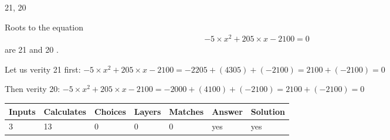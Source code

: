 \documentclass[12pt]{article}
\begin{document}
 
 
\noindent{}
 
 

21,  %
20
 
 
 
\noindent{}
 
 

 
 
 
\noindent{}
 
 

Roots to the equation
\begin{eqnarray*}
-5 \times x^2  %
+  %
205
                 \times x    %
-2100 =0
\end{eqnarray*}
are  %
21 and  %
20 .
 
Let us verity  %
21 first:
$  %
-5 \times x^2  %
+  %
205
                 \times x    %
-2100
  = %
-2205+( %
4305)+( %
-2100)
  = %
2100+( %
-2100)
  = %
0
$
 
Then verity  %
20:
$  %
-5 \times x^2  %
+  %
205
                 \times x    %
-2100
  = %
-2000+( %
4100)+( %
-2100)
  = %
2100+( %
-2100)
  = %
0
$
 
 
 
\noindent{}
 
 

 
\vspace{0.3in}
   
   
   
   
\noindent\begin{tabular}{|l|l|l|l|l|l|l|}
 \hline
Inputs & Calculates & Choices & Layers & Matches & Answer & Solution \\ \hline
           3 & 
          13 & 
           0
  & 
           0 & 
           0 & 
  yes & 
  yes 
  \\ \hline
 \end{tabular}
   
   
   
   
\noindent{}
   
   
  
\end{document}
